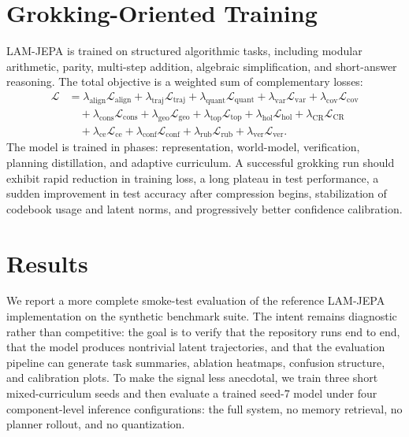 \documentclass[11pt]{article}
\newcommand{\1}{\mathbbm{1}}
\begin{document}
\section{Grokking-Oriented Training}
LAM-JEPA is trained on structured algorithmic tasks, including modular arithmetic, parity, multi-step addition, algebraic simplification, and short-answer reasoning. The total objective is a weighted sum of complementary losses:
\begin{equation}
\begin{aligned}
\mathcal{L}
&=
\lambda_{\mathrm{align}}\mathcal{L}_{\mathrm{align}}
+\lambda_{\mathrm{traj}}\mathcal{L}_{\mathrm{traj}}
+\lambda_{\mathrm{quant}}\mathcal{L}_{\mathrm{quant}}
+\lambda_{\mathrm{var}}\mathcal{L}_{\mathrm{var}}
+\lambda_{\mathrm{cov}}\mathcal{L}_{\mathrm{cov}} \\
&\quad+
\lambda_{\mathrm{cons}}\mathcal{L}_{\mathrm{cons}}
+\lambda_{\mathrm{geo}}\mathcal{L}_{\mathrm{geo}}
+\lambda_{\mathrm{top}}\mathcal{L}_{\mathrm{top}}
+\lambda_{\mathrm{hol}}\mathcal{L}_{\mathrm{hol}}
+\lambda_{\mathrm{CR}}\mathcal{L}_{\mathrm{CR}} \\
&\quad+
\lambda_{\mathrm{ce}}\mathcal{L}_{\mathrm{ce}}
+\lambda_{\mathrm{conf}}\mathcal{L}_{\mathrm{conf}}
+\lambda_{\mathrm{rub}}\mathcal{L}_{\mathrm{rub}}
+\lambda_{\mathrm{ver}}\mathcal{L}_{\mathrm{ver}}.
\end{aligned}
\end{equation}
The model is trained in phases: representation, world-model, verification, planning distillation, and adaptive curriculum. A successful grokking run should exhibit rapid reduction in training loss, a long plateau in test performance, a sudden improvement in test accuracy after compression begins, stabilization of codebook usage and latent norms, and progressively better confidence calibration.



\section{Results}
We report a more complete smoke-test evaluation of the reference LAM-JEPA implementation on the synthetic benchmark suite. The intent remains diagnostic rather than competitive: the goal is to verify that the repository runs end to end, that the model produces nontrivial latent trajectories, and that the evaluation pipeline can generate task summaries, ablation heatmaps, confusion structure, and calibration plots. To make the signal less anecdotal, we train three short mixed-curriculum seeds and then evaluate a trained seed-7 model under four component-level inference configurations: the full system, no memory retrieval, no planner rollout, and no quantization.
\end{document}
